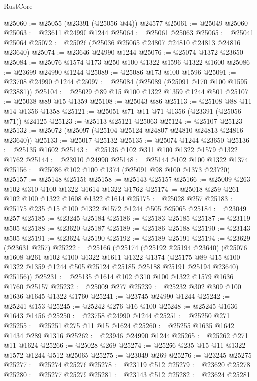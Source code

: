 \begin{lexlean}{RustCore}
\begin{coremodule}
@25060 := @25055 (@23391 (@25056 @44)) @24577
@25061 := @25049 @25060
@25063 := @23611 @24990 @1244
@25064 := @25061 @25063
@25065 := @25041 @25064
@25072 := @25026 (@25036 @25065 @24807 @24810 @24813 @24816 @23640)
@25074 := @23646 @24990 @1244
@25076 := @25074 @1372 @23650
@25084 := @25076 @1574 @173 @250 @100 @1322 @1596 @1322 @1600
@25086 := @23699 @24990 @1244
@25089 := @25086 @173 @100 @1596
@25091 := @23708 @24990 @1244
@25097 := @25084 (@25089 (@25091 @170 @100 @1595 @23881))
@25104 := @25029 @89 @15 @100 @1322 @1359 @1244 @501
@25107 := @25038 @89 @15 @1359
@25108 := @25043 @86
@25113 := @25108 @88 @11 @14 @1356 @1358
@25121 := @25051 @71 @11 @71 @1356 (@23391 (@25056 @71)) @24125
@25123 := @25113 @25121 @25063
@25124 := @25107 @25123
@25132 := @25072 (@25097 (@25104 @25124 @24807 @24810 @24813 @24816 @23640))
@25133 := @25017 @25132
@25135 := @25074 @1244 @23650
@25136 := @25135 @1602
@25143 := @25136 @102 @311 @100 @1322 @1579 @1322 @1762
@25144 := @23910 @24990
@25148 := @25144 @102 @100 @1322 @1374
@25156 := @25086 @102 @100 @1374 (@25091 @98 @100 @1373 @23720)
@25157 := @25148 @25156
@25158 := @25143 @25157
@25166 := @25009 @263 @102 @310 @100 @1322 @1614 @1322 @1762
@25174 := @25018 @259 @261 @102 @100 @1322 @1608 @1322 @1614
@25175 := @25028 @257
@25183 := @25175 @235 @15 @100 @1322 @1572 @1244 @505 @25065
@25184 := @23049 @257
@25185 := @23245 @25184
@25186 := @25183 @25185
@25187 := @23119 @505
@25188 := @23620 @25187
@25189 := @25186 @25188
@25190 := @23143 @505
@25191 := @23624 @25190
@25192 := @25189 @25191
@25194 := @23629 (@23631 @257)
@25222 := @25166
    (@25174
      (@25192 @25194 @23640)
      (@25076
        @1608
        @261
        @102
        @100
        @1322
        @1611
        @1322
        @1374
        (@25175 @89 @15 @100 @1322 @1359 @1244 @505 @25124 @25185 @25188 @25191 @25194 @23640)
        @25156))
@25231 := @25135 @1614 @102 @310 @100 @1322 @1579 @1636 @1760 @25157
@25232 := @25009 @277
@25239 := @25232 @302 @309 @100 @1636 @1645 @1322 @1760
@25241 := @23745 @24990 @1244
@25242 := @25241 @153
@25245 := @25242 @276 @16 @100
@25248 := @25245 @1636 @1643 @1456
@25250 := @23758 @24990 @1244
@25251 := @25250 @271
@25255 := @25251 @275 @11 @15 @1624
@25260 := @25255 @1635 @1642 @1434 @289 @1316
@25262 := @23946 @24990 @1244
@25265 := @25262 @271 @11 @1624
@25266 := @25028 @269
@25274 := @25266 @235 @15 @11 @1322 @1572 @1244 @512 @25065
@25275 := @23049 @269
@25276 := @23245 @25275
@25277 := @25274 @25276
@25278 := @23119 @512
@25279 := @23620 @25278
@25280 := @25277 @25279
@25281 := @23143 @512
@25282 := @23624 @25281

\end{coremodule}
\end{lexlean}
